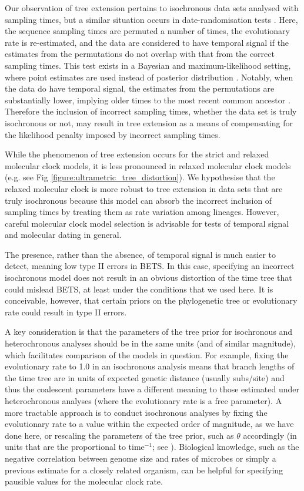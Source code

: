 \documentclass[10pt,letterpaper]{article}
\begin{document}
Our observation of tree extension pertains to isochronous data sets analysed with sampling times, but a similar situation occurs in date-randomisation tests \cite{ramsden2009hantavirus}. {Here, the sequence sampling times are permuted a number of times, the evolutionary rate is re-estimated, and the data are considered to have temporal signal if the estimates from the permutations do not overlap with that from the correct sampling times. This test exists in a Bayesian and maximum-likelihood setting, where point estimates are used instead of posterior distribution \cite{duchene2018inferring}. Notably, when the data do have temporal signal, the estimates from the permutations are substantially lower, implying older times to the most recent common ancestor \cite{rieux2016inferences}. Therefore the inclusion of incorrect sampling times, whether the data set is truly isochronous or not, may result in tree extension as a means of compensating for the likelihood penalty imposed by incorrect sampling times.}

While the phenomenon of tree extension occurs for the strict and relaxed molecular clock models, it is less pronounced in relaxed molecular clock models (e.g. see Fig \ref{figure:ultrametric_tree_distortion}). We hypothesise that the relaxed molecular clock is more robust to tree extension in data sets that are truly isochronous because this model can absorb the incorrect inclusion of sampling times by treating them as rate variation among lineages. {However, careful molecular clock model selection is advisable for tests of temporal signal and molecular dating in general.}

The presence, rather than the absence, of temporal signal is much easier to detect, meaning low type II errors in BETS. In this case, specifying an incorrect isochronous model does not result in an obvious distortion of the time tree that could mislead BETS, at least under the conditions that we used here. It is conceivable, however, that certain priors on the phylogenetic tree or evolutionary rate could result in type II errors. 

A key consideration is that the parameters of the tree prior for isochronous and heterochronous analyses should be in the same units (and of similar magnitude), which facilitates comparison of the models in question. For example, fixing the evolutionary rate to 1.0 in an isochronous analysis means that branch lengths of the time tree are in units of expected genetic distance (usually subs/site) and thus the coalescent parameters have a different meaning to those estimated under heterochronous analyses (where the evolutionary rate is a free parameter). {A more tractable approach is to conduct isochronous analyses by fixing the evolutionary rate to a value within the expected order of magnitude, as we have done here, or rescaling the parameters of the tree prior, such as $\theta$ accordingly (in units that are the proportional to time$^{-1}$; see \cite{boskova2014inference}).} Biological knowledge, such as the negative correlation between genome size and rates of microbes \cite{sanjuan2012molecular, duchene2016genome} or simply a previous estimate for a closely related organism, can be helpful for specifying pausible values for the molecular clock rate.
\end{document}
